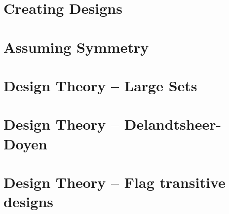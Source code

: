 

\section{Creating Designs}
\label{sec:design}









\bigskip
\clearpage


\section{Assuming Symmetry}
\label{sec:design:assuming:symmetry}









\bigskip
\clearpage


\section{Design Theory -- Large Sets}
\label{sec:large:sets}









\bigskip
\clearpage
\section{Design Theory -- Delandtsheer-Doyen}
\label{sec:design:DD}









\bigskip
\clearpage





\section{Design Theory -- Flag transitive designs}
\label{sec:design:flag:transitive}









\bigskip
\clearpage



